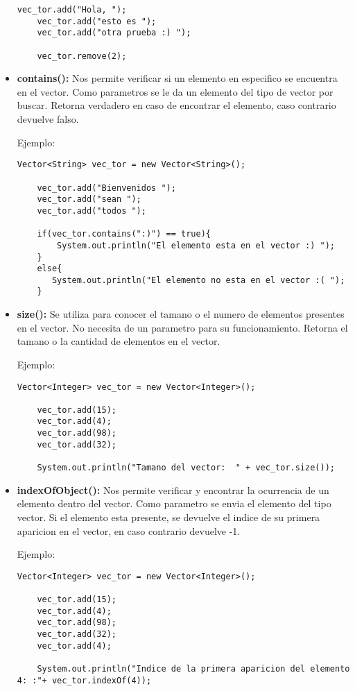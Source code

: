 \documentclass[12pt, letterpaper]{article} %
\begin{document}
\begin{itemize}
\begin{lstlisting}[frame=single]
    vec_tor.add("Hola, ");
    vec_tor.add("esto es ");
    vec_tor.add("otra prueba :) ");

    vec_tor.remove(2);
    \end{lstlisting}

    \item \textbf{contains():} Nos permite verificar si un elemento en especifico se encuentra en el vector. Como parametros se le da un elemento del tipo de vector por buscar. Retorna verdadero en caso de encontrar el elemento, caso contrario devuelve falso.

    Ejemplo:
    \lstset{language = Java, breaklines=true, basicstyle=\footnotesize}
    \begin{lstlisting}[frame=single]
    Vector<String> vec_tor = new Vector<String>();

    vec_tor.add("Bienvenidos ");
    vec_tor.add("sean ");
    vec_tor.add("todos ");

    if(vec_tor.contains(":)") == true){
        System.out.println("El elemento esta en el vector :) ");
    }
    else{
	   System.out.println("El elemento no esta en el vector :( ");
    }
    \end{lstlisting}

    \item \textbf{size():} Se utiliza para conocer el tamano o el numero de elementos presentes en el vector. No necesita de un parametro para su funcionamiento. Retorna el tamano o la cantidad de elementos en el vector.

    Ejemplo:
    \lstset{language = Java, breaklines=true, basicstyle=\footnotesize}
    \begin{lstlisting}[frame=single]
    Vector<Integer> vec_tor = new Vector<Integer>();

    vec_tor.add(15);
    vec_tor.add(4);
    vec_tor.add(98);
    vec_tor.add(32);

    System.out.println("Tamano del vector:  " + vec_tor.size());
    \end{lstlisting}
    
    \item \textbf{indexOfObject():} Nos permite verificar y encontrar la ocurrencia de un elemento dentro del vector. Como parametro se envia el elemento del tipo vector. Si el elemento esta presente, se devuelve el indice de su primera aparicion en el vector, en caso contrario devuelve -1.
    
    Ejemplo:
    \lstset{language = Java, breaklines=true, basicstyle=\footnotesize}
    \begin{lstlisting}[frame=single]
    Vector<Integer> vec_tor = new Vector<Integer>();

    vec_tor.add(15);
    vec_tor.add(4);
    vec_tor.add(98);
    vec_tor.add(32);
    vec_tor.add(4);

    System.out.println("Indice de la primera aparicion del elemento 4: :"+ vec_tor.indexOf(4));
    \end{lstlisting}
\end{itemize}
\end{document}
